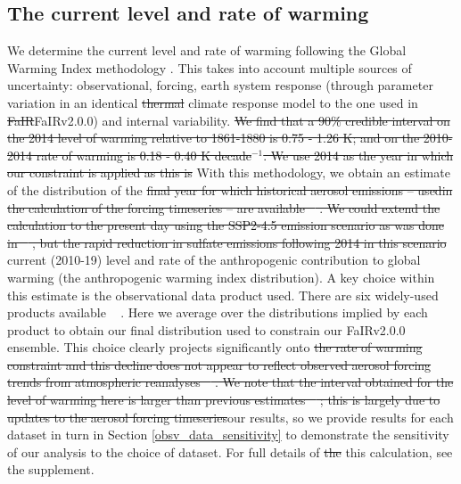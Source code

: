 \documentclass[gmd, manuscript]{copernicus}
\providecommand{\DIFadd}[1]{{\protect\color{blue}#1}} %
\providecommand{\DIFdel}[1]{{\protect\color{red}\sout{#1}}}                      %
\providecommand{\DIFaddbegin}{} %
\providecommand{\DIFaddend}{} %
\providecommand{\DIFdelbegin}{} %
\providecommand{\DIFdelend}{} %
\begin{document}
\subsection{The current level and rate of warming} \label{GWI}
We determine the current level and rate of warming following the Global Warming Index methodology \citep{Haustein2017}. This takes into account multiple sources of uncertainty: observational, forcing, earth system response (through parameter variation in an identical \DIFdelbegin \DIFdel{thermal }\DIFdelend \DIFaddbegin \DIFadd{climate }\DIFaddend response model to the one used in \DIFdelbegin \DIFdel{FaIR}\DIFdelend \DIFaddbegin \DIFadd{FaIRv2.0.0}\DIFaddend ) and internal variability. \DIFdelbegin \DIFdel{We find that a 90\% credible interval on the 2014 level of warming relative to 1861-1880 is 0.75 - 1.26 K; and on the 2010-2014 rate of warming is 0.18 - 0.40 K decade$^{-1}$. We use 2014 as the year in which our constraint is applied as this is }\DIFdelend \DIFaddbegin \DIFadd{With this methodology, we obtain an estimate of the distribution of }\DIFaddend the \DIFdelbegin \DIFdel{final year for which historical aerosol emissions -- usedin the calculation of the forcing timeseries -- are available \mbox{%
\citep{Hoesly2018}}\hspace{0pt}%
. We could extend the calculation to the present day using the SSP2-4.5 emission scenario as was done in \mbox{%
\cite{Smith2020a}}\hspace{0pt}%
, but the rapid reduction in sulfate emissions following 2014 in this scenario }\DIFdelend \DIFaddbegin \DIFadd{current (2010-19) level and rate of the anthropogenic contribution to global warming (the anthropogenic warming index distribution). A key choice within this estimate is the observational data product used. There are six widely-used products available \mbox{%
\citep{Lenssen2019,Cowtan2014,Vose2012,Morice2011,Rohde2013,Morice2020}}\hspace{0pt}%
. Here we average over the distributions implied by each product to obtain our final distribution used to constrain our FaIRv2.0.0 ensemble. This choice clearly }\DIFaddend projects significantly onto \DIFdelbegin \DIFdel{the rate of warming constraint and this decline does not appear to reflect observed aerosol forcing trends from atmospheric reanalyses \mbox{%
\citep{Bellouin2020}}\hspace{0pt}%
. We note that the interval obtained for the level of warming here is larger than previous estimates \mbox{%
\citep{Haustein2017,Leach2018}}\hspace{0pt}%
; this is largely due to updates to the aerosol forcing timeseries}\DIFdelend \DIFaddbegin \DIFadd{our results, so we provide results for each dataset in turn in Section \ref{obsv_data_sensitivity} to demonstrate the sensitivity of our analysis to the choice of dataset}\DIFaddend . For full details of \DIFdelbegin \DIFdel{the }\DIFdelend \DIFaddbegin \DIFadd{this }\DIFaddend calculation, see the supplement.
\end{document}
